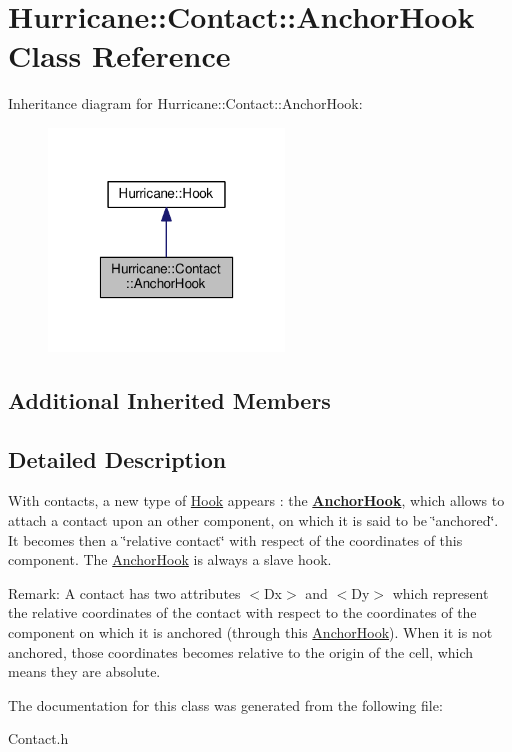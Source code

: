\hypertarget{classHurricane_1_1Contact_1_1AnchorHook}{}\section{Hurricane\+:\+:Contact\+:\+:Anchor\+Hook Class Reference}
\label{classHurricane_1_1Contact_1_1AnchorHook}


Inheritance diagram for Hurricane\+:\+:Contact\+:\+:Anchor\+Hook\+:\nopagebreak
\begin{figure}[H]
\begin{center}
\leavevmode
\includegraphics[width=178pt]{classHurricane_1_1Contact_1_1AnchorHook__inherit__graph}
\end{center}
\end{figure}
\subsection*{Additional Inherited Members}


\subsection{Detailed Description}
With contacts, a new type of \hyperlink{classHurricane_1_1Hook}{Hook} appears \+: the {\bfseries \hyperlink{classHurricane_1_1Contact_1_1AnchorHook}{Anchor\+Hook}}, which allows to attach a contact upon an other component, on which it is said to be \char`\"{}anchored\char`\"{}. It becomes then a \char`\"{}relative contact\char`\"{} with respect of the coordinates of this component. The \hyperlink{classHurricane_1_1Contact_1_1AnchorHook}{Anchor\+Hook} is always a slave hook.

\begin{DoxyParagraph}{Remark\+:}
A contact has two attributes {\ttfamily $<$Dx$>$} and {\ttfamily $<$Dy$>$} which represent the relative coordinates of the contact with respect to the coordinates of the component on which it is anchored (through this \hyperlink{classHurricane_1_1Contact_1_1AnchorHook}{Anchor\+Hook}). When it is not anchored, those coordinates becomes relative to the origin of the cell, which means they are absolute. 
\end{DoxyParagraph}


The documentation for this class was generated from the following file\+:\begin{DoxyCompactItemize}
\item 
Contact.\+h\end{DoxyCompactItemize}
